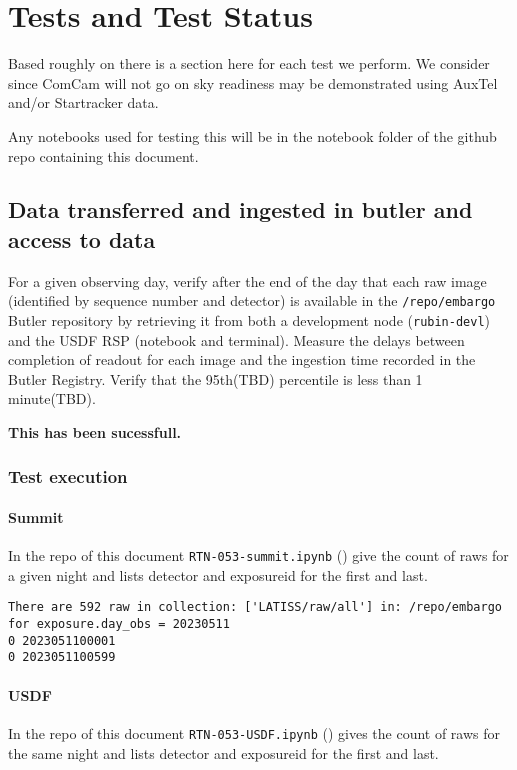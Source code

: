 \section{Tests and Test Status} \label{sec:testing}
Based roughly on  there is a section here for each test we perform.
We consider since ComCam will not go on sky readiness may be demonstrated using AuxTel and/or Startracker data.

Any notebooks used for testing this will be in the notebook folder of the github repo containing this document.

\subsection{Data transferred and ingested in butler and access to data}
For a given observing day, verify after the end of the day that each raw image (identified by sequence number and detector) is available in the \texttt{/repo/embargo} Butler repository by retrieving it from both a development node (\texttt{rubin-devl}) and the USDF RSP (notebook and terminal).
Measure the delays between completion of readout for each image and the ingestion time recorded in the Butler Registry.
Verify that the 95th(TBD) percentile is less than 1 minute(TBD).

\textbf{This has been sucessfull.}

\subsubsection{Test execution}
\paragraph{Summit}
In the repo of this document \texttt{RTN-053-summit.ipynb} () give the count of raws for a given night and lists detector and exposureid for the first and last.

\begin{lstlisting}
There are 592 raw in collection: ['LATISS/raw/all'] in: /repo/embargo for exposure.day_obs = 20230511
0 2023051100001
0 2023051100599
\end{lstlisting}

\paragraph{USDF}
In the repo of this document \texttt{RTN-053-USDF.ipynb} () gives the count of raws for the same night and lists detector and exposureid for the first and last.

